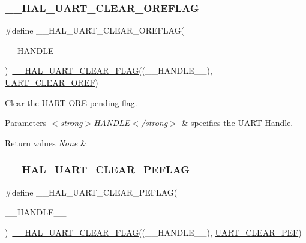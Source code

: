\subsubsection{\texorpdfstring{\+\_\+\+\_\+\+H\+A\+L\+\_\+\+U\+A\+R\+T\+\_\+\+C\+L\+E\+A\+R\+\_\+\+O\+R\+E\+F\+L\+AG}{\_\_HAL\_UART\_CLEAR\_OREFLAG}}
{\footnotesize\ttfamily \#define \+\_\+\+\_\+\+H\+A\+L\+\_\+\+U\+A\+R\+T\+\_\+\+C\+L\+E\+A\+R\+\_\+\+O\+R\+E\+F\+L\+AG(\begin{DoxyParamCaption}\item[{}]{\+\_\+\+\_\+\+H\+A\+N\+D\+L\+E\+\_\+\+\_\+ }\end{DoxyParamCaption})~\hyperlink{group___u_a_r_t___exported___macros_ga9bd035161d41cde4f2568c7af06493bf}{\+\_\+\+\_\+\+H\+A\+L\+\_\+\+U\+A\+R\+T\+\_\+\+C\+L\+E\+A\+R\+\_\+\+F\+L\+AG}((\+\_\+\+\_\+\+H\+A\+N\+D\+L\+E\+\_\+\+\_\+), \hyperlink{group___u_a_r_t___i_t___c_l_e_a_r___flags_ga3bc97b70293f9a7bf8cc21a74094afad}{U\+A\+R\+T\+\_\+\+C\+L\+E\+A\+R\+\_\+\+O\+R\+EF})}



Clear the U\+A\+RT O\+RE pending flag. 


\begin{DoxyParams}{Parameters}
{\em $<$strong$>$\+H\+A\+N\+D\+L\+E$<$/strong$>$} & specifies the U\+A\+RT Handle. \\
\hline
\end{DoxyParams}

\begin{DoxyRetVals}{Return values}
{\em None} & \\
\hline
\end{DoxyRetVals}
\mbox{\label{group___u_a_r_t___exported___macros_gaba5e19c60e0f37341b1585a380b84d49}} 
\subsubsection{\texorpdfstring{\+\_\+\+\_\+\+H\+A\+L\+\_\+\+U\+A\+R\+T\+\_\+\+C\+L\+E\+A\+R\+\_\+\+P\+E\+F\+L\+AG}{\_\_HAL\_UART\_CLEAR\_PEFLAG}}
{\footnotesize\ttfamily \#define \+\_\+\+\_\+\+H\+A\+L\+\_\+\+U\+A\+R\+T\+\_\+\+C\+L\+E\+A\+R\+\_\+\+P\+E\+F\+L\+AG(\begin{DoxyParamCaption}\item[{}]{\+\_\+\+\_\+\+H\+A\+N\+D\+L\+E\+\_\+\+\_\+ }\end{DoxyParamCaption})~\hyperlink{group___u_a_r_t___exported___macros_ga9bd035161d41cde4f2568c7af06493bf}{\+\_\+\+\_\+\+H\+A\+L\+\_\+\+U\+A\+R\+T\+\_\+\+C\+L\+E\+A\+R\+\_\+\+F\+L\+AG}((\+\_\+\+\_\+\+H\+A\+N\+D\+L\+E\+\_\+\+\_\+), \hyperlink{group___u_a_r_t___i_t___c_l_e_a_r___flags_ga9c2aef8048dd09ea5e72d69c63026f02}{U\+A\+R\+T\+\_\+\+C\+L\+E\+A\+R\+\_\+\+P\+EF})}



